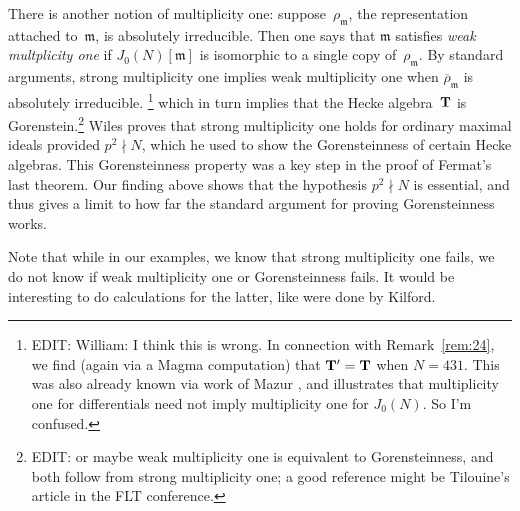 \documentclass[10pt,twoside]{article}
\newcommand{\edit}[1]{\footnote{EDIT: #1}\marginpar{\hfill {\sf \thefootnote}}}
\newcommand{\T}{{\bf{T}}}
\newcommand{\m}{{\mathfrak{m}}}
\theoremstyle{definition}
\begin{document}
{There is another notion of multiplicity one: 
suppose~$\rho_{\m}$, the representation attached to~$\m$,
is absolutely irreducible.
Then one
says that $\m$ satisfies {\em weak multplicity one} if
$J_0(N)[\m]$ is isomorphic to a single copy of~$\rho_{\m}$.
By standard arguments, strong multiplicity one implies
weak multiplicity one when $\overline{\rho}_{\m}$ is absolutely irreducible.
\edit{William: I think this is wrong.
In connection with Remark~\ref{rem:24}, we find (again via a Magma
computation) that $\T'=\T$ when $N=431$.  This was also already known via
work of Mazur \cite{mazur:eisenstein}, and illustrates that
multiplicity one for differentials need not imply multiplicity one for
$J_0(N)$.  So I'm confused.}
which in turn implies that the Hecke algebra~$\T$ is Gorenstein.\edit{or
maybe weak multiplicity one is equivalent to Gorensteinness, and both
follow from strong multiplicity one; a good reference might be
Tilouine's article in the FLT conference.}  Wiles proves that strong
multiplicity one holds for ordinary maximal ideals provided $p^2 \nmid
N$, which he used to show the Gorensteinness of certain Hecke
algebras. This Gorensteinness property was a key step in the proof of
Fermat's last theorem. Our finding above shows that the hypothesis
$p^2 \nmid N$ is essential, and thus gives a limit to how far the
standard argument for proving Gorensteinness works.

Note that while in our examples, we know that strong multiplicity one
fails, we do not know if weak multiplicity one or Gorensteinness
fails. It would be interesting to do calculations for the latter, like
were done by Kilford. 
}

%         
%
\end{document}
